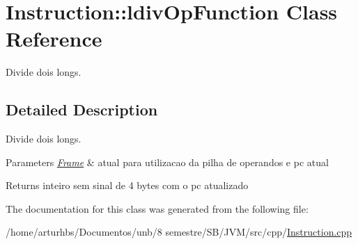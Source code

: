 \hypertarget{classInstruction_1_1ldivOpFunction}{}\section{Instruction\+:\+:ldiv\+Op\+Function Class Reference}
\label{classInstruction_1_1ldivOpFunction}


Divide dois longs.  




\subsection{Detailed Description}
Divide dois longs. 


\begin{DoxyParams}{Parameters}
{\em \hyperlink{classFrame}{Frame}} & atual para utilizacao da pilha de operandos e pc atual \\
\hline
\end{DoxyParams}
\begin{DoxyReturn}{Returns}
inteiro sem sinal de 4 bytes com o pc atualizado 
\end{DoxyReturn}


The documentation for this class was generated from the following file\+:\begin{DoxyCompactItemize}
\item 
/home/arturhbs/\+Documentos/unb/8 semestre/\+S\+B/\+J\+V\+M/src/cpp/\hyperlink{Instruction_8cpp}{Instruction.\+cpp}\end{DoxyCompactItemize}
